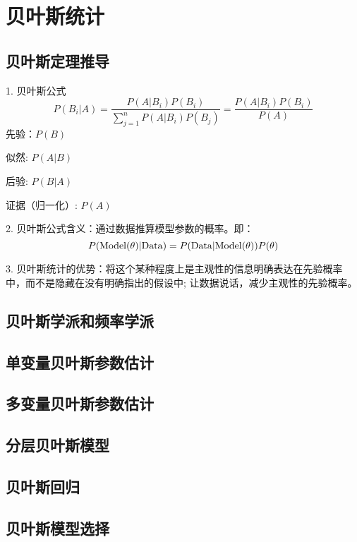 \chapter{贝叶斯统计}
\section{贝叶斯定理推导}
1. 贝叶斯公式
\begin{equation}
    P(B_i|A)=\frac{P(A|B_i)P(B_i)}{\sum_{j=1}^{n}P(A|B_i)P(B_j)}
    =\frac{P(A|B_i)P(B_i)}{P(A)}
\end{equation}
先验：$P(B)$

似然:  $P(A|B)$

后验:  $P(B|A)$

证据（归一化）:  $P(A)$

2. 贝叶斯公式含义：通过数据推算模型参数的概率。即：
\begin{equation}
    P({\rm{Model}} (\theta)|{\rm{Data}})=
    P({\rm{Data}}|{\rm{Model}}(\theta))P(\theta)
\end{equation}


3. 贝叶斯统计的优势：将这个某种程度上是主观性的信息明确表达在先验概率中，而不是隐藏在没有明确指出的假设中; 让数据说话，减少主观性的先验概率。


\section{贝叶斯学派和频率学派}



\section{单变量贝叶斯参数估计}

\section{多变量贝叶斯参数估计}

\section{分层贝叶斯模型}

\section{贝叶斯回归}

\section{贝叶斯模型选择}

